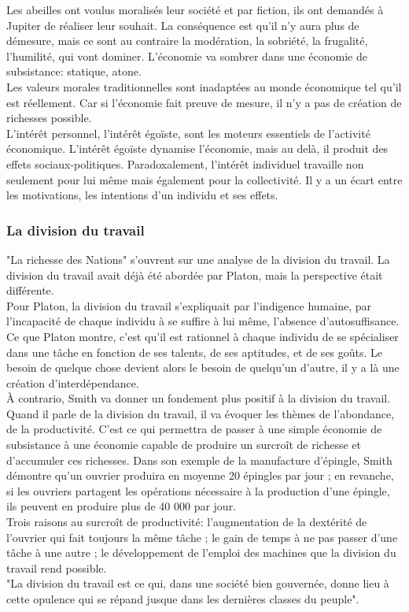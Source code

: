 \documentclass[10pt, a4paper, openany]{book}
\begin{document}
Les abeilles ont voulus moralisés leur société et par fiction, ils ont demandés à Jupiter de réaliser leur souhait. La conséquence est qu'il n'y aura plus de démesure, mais ce sont au contraire la modération, la sobriété, la frugalité, l'humilité, qui vont dominer. L'économie va sombrer dans une économie de subsistance: statique, atone. \\
Les valeurs morales traditionnelles sont inadaptées au monde économique tel qu'il est réellement. Car si l'économie fait preuve de mesure, il n'y a pas de création de richesses possible. \\
L'intérêt personnel, l'intérêt égoïste, sont les moteurs essentiels de l'activité économique. L'intérêt égoïste dynamise l'économie, mais au delà, il produit des effets sociaux-politiques. Paradoxalement, l'intérêt individuel travaille non seulement pour lui même mais également pour la collectivité. Il y a un écart entre les motivations, les intentions d'un individu et ses effets. 


\subsubsection{La division du travail}

"La richesse des Nations" s'ouvrent sur une analyse de la division du travail. La division du travail avait déjà été abordée par Platon, mais la perspective était différente. \\
Pour Platon, la division du travail s'expliquait par l'indigence humaine, par l'incapacité de chaque individu à se suffire à lui même, l'absence d'autosuffisance. Ce que Platon montre, c'est qu'il est rationnel à chaque individu de se spécialiser dans une tâche en fonction de ses talents, de ses aptitudes, et de ses goûts. Le besoin de quelque chose devient alors le besoin de quelqu'un d'autre, il y a là une création d'interdépendance. \\
À contrario, Smith va donner un fondement plus positif à la division du travail. Quand il parle de la division du travail, il va évoquer les thèmes de l'abondance, de la productivité. C'est ce qui permettra de passer à une simple économie de subsistance à une économie capable de produire un surcroît de richesse et d'accumuler ces richesses. Dans son exemple de la manufacture d'épingle, Smith démontre qu'un ouvrier produira en moyenne 20 épingles par jour ; en revanche, si les ouvriers partagent les opérations nécessaire à la production d'une épingle, ils peuvent en produire plus de 40 000 par jour. \\
Trois raisons au surcroît de productivité: l'augmentation de la dextérité de l'ouvrier qui fait toujours la même tâche ; le gain de temps à ne pas passer d'une tâche à une autre ; le développement de l'emploi des machines que la division du travail rend possible. \\
"La division du travail est ce qui, dans une société bien gouvernée, donne lieu à cette opulence qui se répand jusque dans les dernières classes du peuple".
\end{document}
